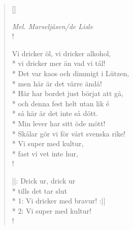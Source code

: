 
\settowidth{\versewidth}{Här har bordet just börjat att gå,}



\begin{verse}[\versewidth]

\flagverse{}
\emph{Mel. Marseljäsen/de Lisle}\\!

Vi dricker öl, vi dricker alkohol,\\*
vi dricker mer än vad vi tål!\\*
Det var kaos och dimmigt i Lützen,\\*
men här är det värre ändå!\\*
Här har bordet just börjat att gå,\\*
och denna fest helt utan lik é\\*
så här är det inte så dött.\\*
Min lever har sitt öde mött!\\*
Skålar gör vi för vårt svenska rike!\\*
Vi super med kultur,\\*
fast vi vet inte hur,\\!

||: Drick ur, drick ur\\*
tills det tar slut\\*
1: Vi dricker med bravur! :||\\*
2: Vi super med kultur!\\!




\end{verse}

